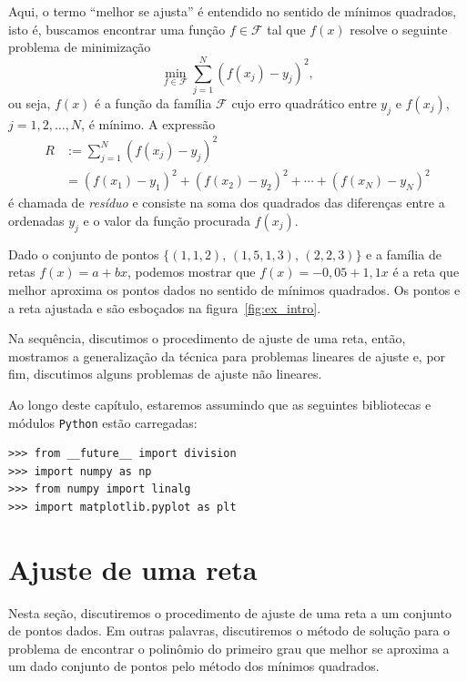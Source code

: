 Aqui, o termo ``melhor se ajusta'' é entendido no sentido de mínimos quadrados, isto é, buscamos encontrar uma função $f\in\mathcal{F}$ tal que $f(x)$ resolve o seguinte problema de minimização
\begin{equation*}
  \min_{f\in\mathcal{F}} \sum_{j=1}^N \left(f(x_j) - y_j\right)^2,
\end{equation*}
ou seja, $f(x)$ é a função da família $\mathcal{F}$ cujo erro quadrático entre $y_j$ e $f(x_j)$, $j = 1, 2, \dotsc, N$, é mínimo. A expressão
\begin{equation*}
  \begin{split}
  R &:= \sum_{j=1}^N \left(f(x_j)-y_j\right)^2 \\
  &= \left(f(x_1)-y_1\right)^2 +  \left(f(x_2)-y_2\right)^2 + \cdots + \left(f(x_N)- y_N\right)^2    
  \end{split}
\end{equation*}
é chamada de \emph{resíduo} e consiste na soma dos quadrados das diferenças entre a ordenadas $y_j$ e o valor da função procurada $f(x_j)$.

\begin{ex}\label{ex:intro_ajuste}
  Dado o conjunto de pontos $\{(1, 1,2)$, $(1,5, 1,3)$, $(2, 2,3)\}$ e a família de retas $f(x) = a + bx$, podemos mostrar que $f(x) = -0,05 + 1,1x$ é a reta que melhor aproxima os pontos dados no sentido de mínimos quadrados.  Os pontos e a reta ajustada e são esboçados na figura~\ref{fig:ex_intro}.
\end{ex}

Na sequência, discutimos o procedimento de ajuste de uma reta, então, mostramos a generalização da técnica para problemas lineares de ajuste e, por fim, discutimos alguns problemas de ajuste não lineares.

\ifispython
  Ao longo deste capítulo, estaremos assumindo que as seguintes bibliotecas e módulos \verb+Python+ estão carregadas:
\begin{verbatim}
>>> from __future__ import division
>>> import numpy as np
>>> from numpy import linalg
>>> import matplotlib.pyplot as plt
\end{verbatim}
\fi


\section{Ajuste de uma reta}

Nesta seção, discutiremos o procedimento de ajuste de uma reta a um conjunto de pontos dados. Em outras palavras, discutiremos o método de solução para o problema de encontrar o polinômio do primeiro grau que melhor se aproxima a um dado conjunto de pontos pelo método dos mínimos quadrados. 

